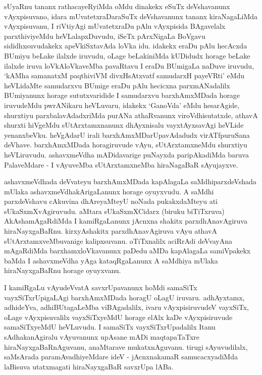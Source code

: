 \begin{artha}
sUyaRnu tananx rathacayeRyiMda oMdu dinakekx eSuTx deVshavanunx vAyxpisuvano, idara mUvatetxraDaraSuTx deVshavanunx tananx kiraNagaLiMda vAyxpisuvanu, I riVtiyAgi mUvatetxraDu pAlu vAyxpisida BAgavelalx parxthiviyeMdu heVLalapxDuvudu, iSeTx pArxNigaLa BoVgavu sididhxsuvudakekx apeVkiSxtavAda loVka idu. idakekx eraDu pAlu hecAcxda BUmiyu beLake ilalxde iruvudu, oLage beLakiniMda kUDidudx horage beLake ilalxde iruva loVkAloVkaveMba pavaRtavu I eraDu BUmigaLa naDuve iruvudu, `kAMha samanatxM paqthiviVM divxHsAtxvatf samudarxH payeVRti' eMdu heVLidaMte samudarxvu BUmige eraDu pAlu hecicxna parxmANadalilx BUmiyanunx horage sututxvaridide I samudarxvu barxhAmxMDada horage iruvudeMdu pwrANikaru heVLuvaru, idakekx `GanoVda' eMdu hesarAgide, shurxtiyu parxbalavAdadxriMda purANa athaRvanunx viroVdhisutatxde, athavA shurxti hiVgeMdu sUtArxtamxnanunx dhAyxnisalu vayxtAyxsavAgi heVLide yenanxbeVku. heVgAdarU irali barxhAmxMDarUpavAdadudx virATfpuruSana deVhave. barxhAmxMDada horagiruvude vAyu, sUtArxtamxneMdu shurxtiyu heVLiruvudu. ashavxmeVdha mADidavarige puNayxda paripAkadiMda baruva PalaveMdare - I vAyuveMba sUtArxtamxneMba hiraNagaBaR sAyujayxve.
\end{artha}

\begin{artha}
ashavxmeVdhada deVvateyu barxhAmxMDada kapAlagaLa saMdhiparxdeVshada mUlaka ashavxmeVdhakArigaLanunx horage oyuyxvudu. A saMdhi parxdeVshavu cAkuvina dhAreyaMteyU noNada pukakxdaMteyu ati sUkaSxmXvAgiruvudu. aMtara sUkaSxmXCidarx (biruku biTiTxruva) AkAshamAgaRdiMda I kamiRgaLanunx jAcnxna shakitx parxdhAnavAgiruva hiraNayxgaBaRnu. kirxyAshakitx parxdhAnavAgiruva vAyu athavA sUtArxtamxveMbuvanige kalipxsuvanu. oTiTxnalilx aciRrAdi deVvayAna mAgaRdiMda barxhamxloVkavanunx paDedu aMDa kapAlagaLa samiVpakekx baMda I ashavxmeVdha yAga kataqRgaLanunx A saMdhiya mUlaka hiraNayxgaBaRnu horage oyuyxvanu. 
\end{artha}

\begin{artha}
I kamiRgaLu vAyudeVvatA savxrUpavanunx hoMdi samaSiTx vayxSiTxrUpigaLAgi barxhAmxMDada horagU oLagU iruvaru. adhAyxtamx, adhideYva, adhiBUtagaLeMba viBAgadalilx, ivaru vAyxpisiruvudeV vayxSiTx, oLage vAyxpisuvalilx vayxSiTxyeMdU horage elAlx kaDe vAyxpisiruvude samaSiTxyeMdU heVLuvudu. I samaSiTx vayxSiTxrUpadalilx Itanu sAdhakanAgiralu vAyuvanunx upAsane mADi maqtapaTaTxre hiraNayxgaBaRnAguvanu, anaMtarave mukatxnAguvanu. tirugi sAyuvudilalx, saMsArada paramAvadhiyeMdare ideV - jAcnxnakamaR samucacxyadiMda laBisuva utatxmagati hiraNayxgaBaR savxrUpa lABa.
\end{artha}

